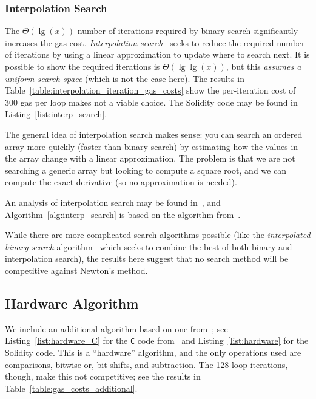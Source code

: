 


\subsubsection{Interpolation Search}

The $\Theta(\lg(x))$ number of iterations required by binary search
significantly increases the gas cost.
\emph{Interpolation search}~\cite{gonnet1980algorithmic}
seeks to reduce the required number of iterations
by using a linear approximation to update where to search next.
It is possible to show the required iterations is $\Theta(\lg\lg(x))$,
but this \emph{assumes a uniform search space}
(which is not the case here).
The results in Table~\ref{table:interpolation_iteration_gas_costs}
show the per-iteration cost of 300 gas per loop makes not a viable choice.
The Solidity code may be found in Listing~\ref{list:interp_search}.

The general idea of interpolation search makes sense:
you can search an ordered array more quickly (faster than binary search)
by estimating how the values in the array change with a linear approximation.
The problem is that we are not searching a generic array
but looking to compute a square root,
and we can compute the exact derivative (so no approximation is needed).

An analysis of interpolation search may be found
in~\cite{gonnet1980algorithmic},
and Algorithm~\ref{alg:interp_search} is based on the algorithm
from~\cite[Page 41]{gonnet1980algorithmic}.

While there are more complicated search algorithms possible
(like the
\emph{interpolated binary search} algorithm~\cite{mohammed2021interpolated}
which seeks to combine the best of both binary and interpolation search),
the results here suggest that no search method
will be competitive against Newton's method.





\subsection{Hardware Algorithm}

We include an additional algorithm based on one
from~\cite[Page 285]{HackersDelight};
see Listing~\ref{list:hardware_C}
for the \texttt{C} code from~\cite{HackersDelightArchive}
and Listing~\ref{list:hardware} for the Solidity code.
This is a ``hardware'' algorithm,
and the only operations used are comparisons, bitwise-or, bit shifts,
and subtraction.
The 128 loop iterations, though, make this not competitive;
see the results in Table~\ref{table:gas_costs_additional}.

